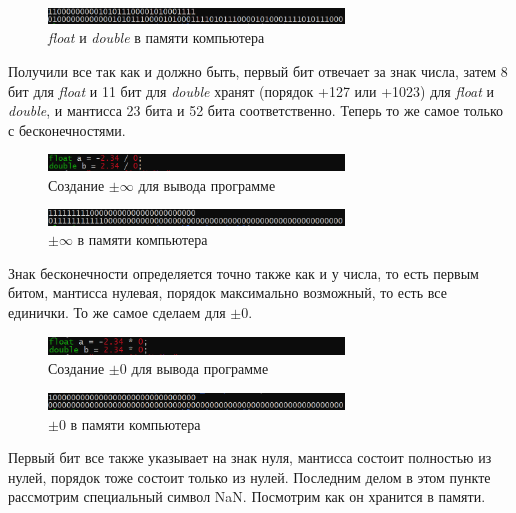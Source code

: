 \documentclass[a4paper,12pt]{article}
\begin{document}
\begin{figure}[H]\label{fig: bits d and f result}
    \centering
    \includegraphics[width=0.7\textwidth]{Побитовое представление f d.png}
    \caption{\textit{float} и \textit{double} в памяти компьютера}
\end{figure}
Получили все так как и должно быть, первый бит отвечает за знак числа, затем 8 бит для \textit{float} и 11 бит для \textit{double}
хранят (порядок +127 или +1023) для \textit{float} и \textit{double}, и мантисса 23 бита и 52 бита соответственно.
Теперь то же самое только с бесконечностями.
\begin{figure}[H]\label{fig: bits pm inf}
    \centering
    \includegraphics[width=0.7\textwidth]{Вставка pm inf.png}
    \caption{Создание $\pm \infty$ для вывода программе}
\end{figure}

\begin{figure}[H]\label{fig: bits pm inf result}
    \centering
    \includegraphics[width=0.7\textwidth]{Побитовое представление pm inf.png}
    \caption{$\pm \infty$ в памяти компьютера}
\end{figure}
Знак бесконечности определяется точно также как и у числа, то есть первым битом, мантисса нулевая, порядок максимально возможный, то есть все единички. То же самое сделаем для $\pm 0$.
\begin{figure}[H]\label{fig: bits pm 0}
    \centering
    \includegraphics[width=0.7\textwidth]{Вставка pm 0.png}
    \caption{Создание $\pm 0$ для вывода программе}
\end{figure}

\begin{figure}[H]\label{fig: bits pm 0 result}
    \centering
    \includegraphics[width=0.7\textwidth]{Побитовое представление pm 0.png}
    \caption{$\pm 0$ в памяти компьютера}
\end{figure}
Первый бит все также указывает на знак нуля, мантисса состоит полностью из нулей, порядок тоже состоит только из нулей. Последним делом в этом пункте рассмотрим специальный символ NaN. Посмотрим как он хранится в памяти.  
\newpage
\end{document}
